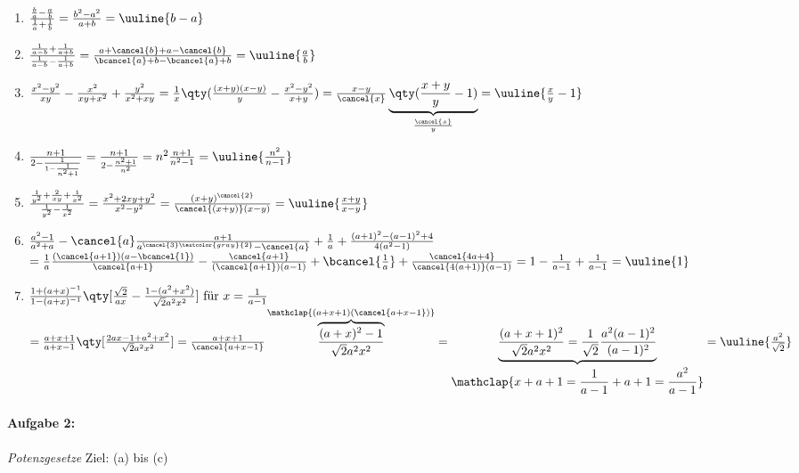 \begin{enumerate}[label=(\alph*)]
    \item $\frac{\frac{b}{a}-\frac{a}{b}}{\frac{1}{a}+\frac{1}{b}} = \frac{b^2 - a^2}{a+b} = \uuline{b-a}$
    \item $\frac{\frac{1}{a-b}+\frac{1}{a+b}}{\frac{1}{a-b}-\frac{1}{a+b}} = \frac{a + \cancel{b} + a - \cancel{b}}{\bcancel{a} + b - \bcancel{a} + b} = \uuline{\frac{a}{b}}$
    \item $\frac{x^2-y^2}{xy}-\frac{x^2}{xy+x^2}+\frac{y^2}{x^2+xy} = \frac{1}{x} \qty(\frac{(x+y)(x-y)}{y} - \frac{x^2 - y^2}{x+y}) = \frac{x-y}{\cancel{x}} \underbrace{\qty(\frac{x+y}{y}-1)}_{\frac{\cancel{x}}{y}} = \uuline{\frac{x}{y}-1}$ \vspace{-5mm}
    \item $\frac{n+1}{2-\frac{1}{1-\frac{1}{n^2+1}}} = \frac{n+1}{2-\frac{n^2+1}{n^2}} = n^2 \frac{n+1}{n^2 -1} = \uuline{\frac{n^2}{n-1}}$
    \item $\frac{\frac{1}{y^2}+\frac{2}{xy}+\frac{1}{x^2}}{\frac{1}{y^2}-\frac{1}{x^2}} = \frac{x^2 +2xy + y^2 }{x^2 -y^2} = \frac{(x+y)^{\cancel{2}}}{\cancel{(x+y)}(x-y)} = \uuline{\frac{x+y}{x-y}}$
    \item $\frac{a^2-1}{a^2+a}-\cancel{a}\frac{a+1}{a^{\cancel{3}\textcolor{gray}{2}}-\cancel{a}}+\frac{1}{a}+\frac{(a+1)^2-(a-1)^2+4}{4(a^2-1)} $\\
    $= \frac{1}{a} \frac{(\cancel{a+1}) (a-\bcancel{1})}{\cancel{a+1}} - \frac{\cancel{a+1}}{(\cancel{a+1})(a-1)} + \bcancel{\frac{1}{a}} + \frac{\cancel{4a+4}}{\cancel{4(a+1)}(a-1)} = 1- \frac{1}{a-1}+\frac{1}{a-1} = \uuline{1}$
    \item $\frac{1+(a+x)^{-1}}{1-(a+x)^{-1}}\qty[\frac{\sqrt{2}}{ax}-\frac{1-(a^2+x^2)}{\sqrt{2}a^2x^2}] \text{ für } x=\frac{1}{a-1}$ \\
    $= \frac{a+x+1}{a+x-1}\qty[\frac{2ax -1 +a^2 +x^2}{\sqrt{2} a^2 x^2}] = \frac{a+x+1}{\cancel{a+x-1}} \overbrace{\frac{(a+x)^2 -1}{\sqrt{2}a^2 x^2}}^{\mathclap{(a+x+1)(\cancel{a+x-1})}} = \underbrace{\frac{(a+x+1)^2}{\sqrt{2}a^2 x^2} = \frac{1}{\sqrt{2}} \frac{a^2 (a-1)^2}{(a-1)^2}}_{\displaystyle \mathclap{x+a+1 = \frac{1}{a-1} + a+ 1 = \frac{a^2}{a-1}}} = \uuline{\frac{a^2}{\sqrt{2}}}$ 
\end{enumerate}

\paragraph{Aufgabe 2: } \emph{Potenzgesetze} \hfill Ziel: (a) bis (c)\\[0.2cm]

